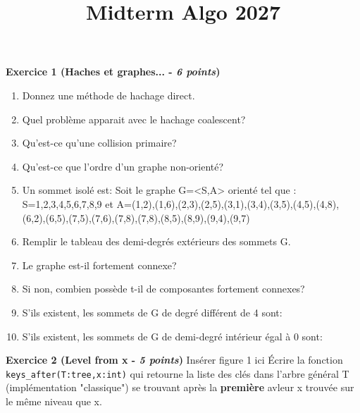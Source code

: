 \documentclass{article}
\author{}
\date{}
\title{Midterm Algo 2027}
\begin{document}
\maketitle

\noindent\textbf{Exercice 1 (Haches et graphes... - \textit{6 points})}
\begin{enumerate}
    \item Donnez une méthode de hachage direct.
    \item Quel problème apparait avec le hachage coalescent?
    \item Qu'est-ce qu'une collision primaire?
    \item Qu'est-ce que l'ordre d'un graphe non-orienté?
    \item Un sommet isolé est:\newline\newline
    Soit le graphe G=<S,A> orienté tel que : S={1,2,3,4,5,6,7,8,9} et\newline
    A={(1,2),(1,6),(2,3),(2,5),(3,1),(3,4),(3,5),(4,5),(4,8),(6,2),(6,5),(7,5),(7,6),(7,8),(7,8),(8,5),(8,9),(9,4),(9,7)}
    \item Remplir le tableau des demi-degrés extérieurs des sommets G.
    \item Le graphe est-il fortement connexe?
    \item Si non, combien possède t-il de composantes fortement connexes?
    \item S'ils existent, les sommets de G de degré différent de 4 sont:
    \item S'ils existent, les sommets de G de demi-degré intérieur égal à 0 sont:
\end{enumerate}

\noindent\textbf{Exercice 2 (Level from x - \textit{5 points})}
Insérer figure 1 ici\newline
Écrire la fonction  \verb|keys_after(T:tree,x:int)| qui retourne la liste des clés dans l'arbre général T (implémentation "classique") se trouvant après la \textbf{première} avleur x trouvée sur le même niveau que x.\newline
\end{document}
